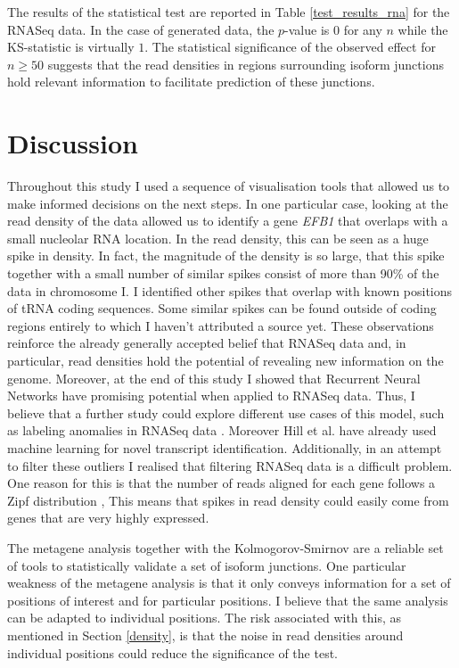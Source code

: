 \documentclass[12pt]{article}
\begin{document}
The results of the statistical test are reported in Table \ref{test_results_rna} for the RNASeq data. In the case of generated data, the $p$-value is $0$ for any $n$ while the KS-statistic is virtually $1$. The statistical significance of the observed effect for $n \ge 50$ suggests that the read densities in regions surrounding isoform junctions hold relevant information to facilitate prediction 
of these junctions. 








\section{Discussion}\label{disc}
Throughout this study I used a sequence of visualisation tools that allowed us to make informed decisions on the next steps. In one particular case, looking at the read density of the data allowed us to identify a gene \textit{EFB1} that overlaps with a small nucleolar RNA location. In the read density, this can be seen as a huge spike in density. In fact, the magnitude of the density is so large, that this spike together with a small number of similar spikes consist of more than 90\% of the data in chromosome I. I identified other spikes that overlap with known positions of tRNA coding sequences. Some similar spikes can be found outside of coding regions entirely to which I haven't attributed a source yet. These observations reinforce the already generally accepted belief that RNASeq data and, in particular, read densities hold the potential of revealing new information on the genome. Moreover, at the end of this study I showed that Recurrent Neural Networks have promising potential when applied to RNASeq data. Thus, I believe that a further study could explore different use cases of this model, such as labeling anomalies in RNASeq data \cite{Zhang2017}. Moreover Hill et al. \cite{Hill2018} have already used machine learning for novel transcript identification. Additionally, in an attempt to filter these outliers I realised that filtering RNASeq data is a difficult problem. One reason for this is that the number of reads aligned for each gene follows a Zipf distribution \cite{PhysRevLett.90.088102}, This means that spikes in read density could easily come from genes that are very highly expressed. 
 

The metagene analysis together with the Kolmogorov-Smirnov are a reliable set of tools to statistically validate a set of isoform junctions. One particular weakness of the metagene analysis is that it only conveys information for a set of positions of interest and for particular positions. I believe that the same analysis can be adapted to individual positions. The risk associated with this, as mentioned in Section \ref{density}, is that the noise in read densities around individual positions could reduce the significance of the test.  
\end{document}
